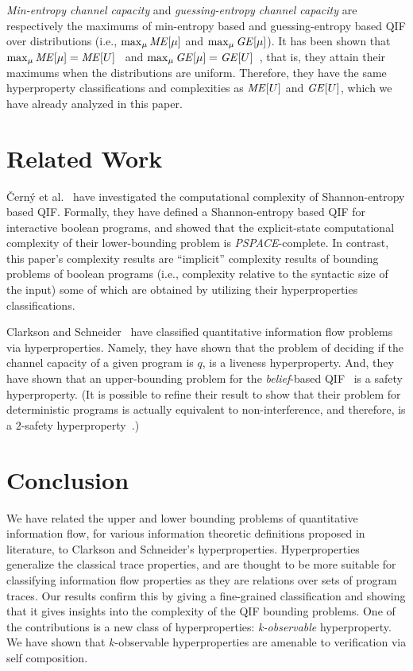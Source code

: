 \documentclass[]{eptcs}
\begin{document}
{\it Min-entropy channel capacity} and {\it guessing-entropy channel
  capacity} are respectively the maximums of min-entropy based and
guessing-entropy based QIF over distributions (i.e., $\max_\mu{\it
  ME}[\mu]$ and $\max_\mu{\it GE}[\mu]$).  It has been shown that
$\max_\mu{\it ME}[\mu] = {\it
  ME}[U]$~\cite{DBLP:journals/entcs/BraunCP09,DBLP:conf/csfw/KopfS10}
and $\max_\mu{\it GE}[\mu] = {\it GE}[U]$~\cite{yasuoka:jocssubmit},
that is, they attain their maximums when the distributions are
uniform.  Therefore, they have the same hyperproperty classifications
and complexities as ${\it ME}[U]$ and ${\it GE}[U]$, which we have
already analyzed in this paper.


\section{Related Work}
{\v C}ern\'y et al.~\cite{DBLP:conf/csfw/CernyCH11} have investigated
the computational complexity of Shannon-entropy based QIF.  Formally,
they have defined a Shannon-entropy based QIF for interactive boolean
programs, and showed that the explicit-state computational complexity
of their lower-bounding problem is {\it PSPACE}-complete.  In
contrast, this paper's complexity results are ``implicit'' complexity
results of bounding problems of boolean programs (i.e., complexity
relative to the syntactic size of the input) some of which are
obtained by utilizing their hyperproperties classifications.

Clarkson and Schneider~\cite{DBLP:journals/jcs/ClarksonS10} have
classified quantitative information flow problems via hyperproperties.
Namely, they have shown that the problem of deciding if the channel
capacity of a given program is $q$, is a liveness hyperproperty.  And,
they have shown that an upper-bounding problem for the {\em
  belief}-based QIF~\cite{clarkson:csf2005} is a safety hyperproperty.
(It is possible to refine their result to show that their problem for
deterministic programs is actually equivalent to non-interference, and
therefore, is a $2$-safety hyperproperty~\cite{yasuoka:jocssubmit}.)


\section{Conclusion}

We have related the upper and lower bounding problems of quantitative
information flow, for various information theoretic definitions
proposed in literature, to Clarkson and Schneider's hyperproperties.
Hyperproperties generalize the classical trace properties, and are
thought to be more suitable for classifying information flow
properties as they are relations over sets of program traces.  Our
results confirm this by giving a fine-grained classification and
showing that it gives insights into the complexity of the QIF bounding
problems.  One of the contributions is a new class of hyperproperties:
{\em k-observable} hyperproperty.  We have shown that $k$-observable
hyperproperties are amenable to verification via self composition.



\end{document}
